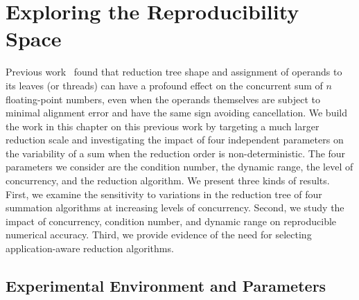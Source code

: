 \section{Exploring the Reproducibility Space} 

Previous work~\cite{chiang13, balaji13} found that reduction tree
shape and assignment of operands to its leaves (or threads) can have a
profound effect on the concurrent sum of $n$ floating-point numbers,
even when the operands themselves are subject to minimal alignment
error and have the same sign avoiding cancellation.  We build the work
in this chapter on this previous work by targeting a much larger
reduction scale and investigating the impact of four independent
parameters on the variability of a sum when the reduction order is
non-deterministic. The four parameters we consider are the condition
number, the dynamic range, the level of concurrency, and the reduction
algorithm. We present three kinds of results. First, we examine the
sensitivity to variations in the reduction tree of four summation
algorithms at increasing levels of concurrency. Second, we study the
impact of concurrency, condition number, and dynamic range on
reproducible numerical accuracy. Third, we provide evidence of the
need for selecting application-aware reduction algorithms.

\subsection{Experimental Environment and Parameters}

